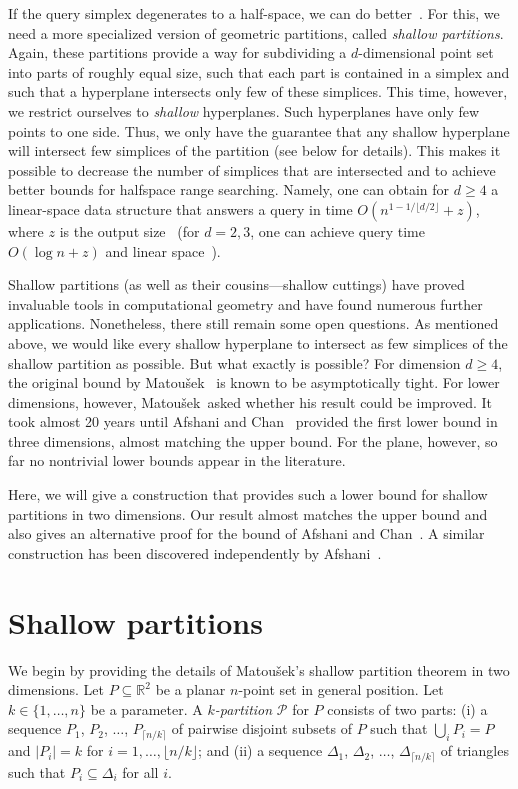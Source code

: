 \documentclass{paper}
\newcommand\R{{\mathbb R}}
\newcommand\matousek{{Matou{\v{s}}ek}}
\begin{document}
If the query simplex degenerates to a half-space, we can
do better~\cite{Matousek92}. For this, we need a more specialized version of
geometric partitions, called \emph{shallow partitions}. Again, these
partitions provide a way for subdividing a $d$-dimensional point set into
parts of roughly equal size, such that each part is contained in a simplex and
such that a hyperplane intersects only few of these simplices. 
This time, however, we restrict ourselves to \emph{shallow} hyperplanes. 
Such hyperplanes have only few points to one side. 
Thus, we only have the guarantee
that any shallow hyperplane will intersect few simplices of the partition
(see below for details).
This makes it possible to decrease the number of simplices that are intersected 
and to achieve better bounds for halfspace range searching. Namely, one
can obtain for $d \geq 4$ a linear-space data structure that answers a query in time
$O(n^{1-1/\lfloor d/2 \rfloor} + z)$, where $z$ is the output 
size~\cite{Chan10} (for $d=2,3$, one can achieve query time $O(\log n + z)$
and linear space~\cite{AfshaniCh09}).

Shallow partitions (as well as their cousins---shallow cuttings) have proved
invaluable tools in computational geometry and have found numerous further
applications. Nonetheless, there still remain some open questions. 
As mentioned above, we would like every shallow hyperplane 
to intersect as few simplices of the shallow partition as possible.
But what exactly is possible? For dimension $d \geq 4$, the original bound
by \matousek~\cite{Matousek92b} is known to be asymptotically tight. For
lower dimensions, however, \matousek\ asked whether his result could be 
improved.
It took almost 20 years until Afshani and Chan~\cite{AfshaniCh09}
provided the first lower bound in three dimensions, almost
matching the upper bound. For the plane, however, so far no nontrivial
lower bounds appear in the literature. 

Here, we will give a construction that
provides such a lower bound for shallow partitions in two dimensions.
Our result almost matches the upper bound and also gives an alternative
proof for the bound of Afshani and Chan~\cite{AfshaniCh09}.
A similar construction has been discovered independently by
Afshani~\cite{Afshani10}.


\section{Shallow partitions}

We begin by providing the details of \matousek's shallow partition theorem
in two dimensions.
Let $P \subseteq \R^2$ be a planar $n$-point set in general position.
Let $k \in \{1, \ldots, n\}$ be a parameter. 
A \emph{$k$-partition} $\mathcal{P}$ for $P$ consists of two parts:
(i) a sequence $P_1$, $P_2$, $\ldots$, $P_{\lceil n/k\rceil}$ of
pairwise disjoint subsets of $P$ such that $\bigcup_i P_i = P$
and $|P_i| = k$ for $i = 1, \ldots, \lfloor n/k \rfloor$; and
(ii) a sequence $\Delta_1$, $\Delta_2$, $\ldots$, $\Delta_{\lceil n/k\rceil}$
of triangles such that $P_i \subseteq \Delta_i$ for all $i$.
\end{document}
